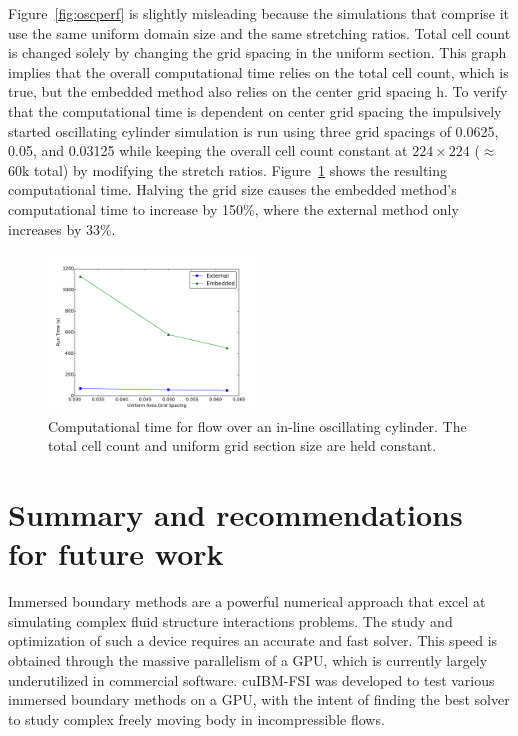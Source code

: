 \documentclass[preprint,12pt]{elsarticle}
\begin{document}
Figure~\ref{fig:oscperf} is slightly misleading because the simulations that comprise it use the same uniform domain size and the same stretching ratios.
Total cell count is changed solely by changing the grid spacing in the uniform section.
This graph implies that the overall computational time relies on the total cell count, which is true, but the embedded method also relies on the center grid spacing h.
To verify that the computational time is dependent on center grid spacing the impulsively started oscillating cylinder simulation is run using three grid spacings of 0.0625, 0.05, and 0.03125 while keeping the overall cell count constant at $224\times224$ ($\approx$60k total) by modifying the stretch ratios.
Figure~\ref{fig:performance2} shows the resulting computational time.
Halving the grid size causes the embedded method's computational time to increase by 150\%, where the external method only increases by 33\%.
\begin{figure}[!htb]
	\centering
	\includegraphics[width=0.5\textwidth]{performance_oscflow2}
	\caption{Computational time for flow over an in-line oscillating cylinder. The total cell count and uniform grid section size are held constant.}
	\label{fig:performance2}
\end{figure}

\section{Summary and recommendations for future work}
Immersed boundary methods are a powerful numerical approach that excel at simulating complex fluid structure interactions problems.
The study and optimization of such a device requires an accurate and fast solver.
This speed is obtained through the massive parallelism of a GPU, which is currently largely underutilized in commercial software.
cuIBM-FSI was developed to test various immersed boundary methods on a GPU, with the intent of finding the best solver to study complex freely moving body in incompressible flows.
\end{document}
